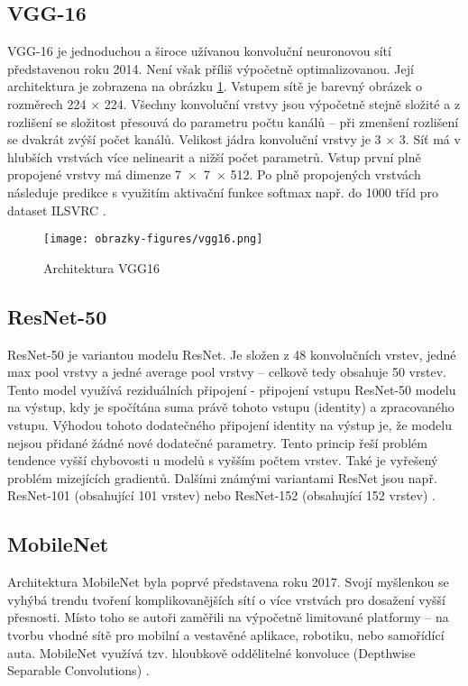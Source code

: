 \subsection{VGG-16}
VGG-16 je jednoduchou a široce užívanou konvoluční neuronovou sítí představenou roku 2014. Není však příliš výpočetně optimalizovanou. Její architektura je zobrazena na obrázku \ref{fig:vgg}. Vstupem sítě je barevný obrázek o rozměrech 224 $\times$ 224. Všechny konvoluční vrstvy jsou výpočetně stejně složité a z rozlišení se složitost přesouvá do parametru počtu kanálů -- při zmenšení rozlišení se dvakrát zvýší počet kanálů. Velikost jádra konvoluční vrstvy je 3 $\times$ 3. Síť má v hlubších vrstvách více nelinearit a nižší počet parametrů. Vstup první plně propojené vrstvy má dimenze 7~$\times$~7~$\times$ 512. Po plně propojených vrstvách následuje predikce s využitím aktivační funkce softmax např. do 1000 tříd pro dataset ILSVRC \cite{VGG16}.

\begin{figure}[!htbp]
    \centering
    \texttt{[image: obrazky-figures/vgg16.png]}
    \caption{Architektura VGG16 \cite{VGG16}}
    \label{fig:vgg}
\end{figure}

\subsection{ResNet-50}
ResNet-50 je variantou modelu ResNet. Je složen z 48 konvolučních vrstev, jedné max pool vrstvy a jedné average pool vrstvy -- celkově tedy obsahuje 50 vrstev. Tento model využívá reziduálních připojení - připojení vstupu ResNet-50 modelu na výstup, kdy je spočítána suma právě tohoto vstupu (identity) a zpracovaného vstupu. Výhodou tohoto dodatečného připojení identity na výstup je, že modelu nejsou přidané žádné nové dodatečné parametry. Tento princip řeší problém tendence vyšší chybovosti u modelů s vyšším počtem vrstev. Také je vyřešený problém mizejících gradientů. Dalšími známými variantami ResNet jsou např. ResNet-101 (obsahující 101 vrstev) nebo ResNet-152 (obsahující 152 vrstev) \cite{ResNet50}.
\subsection{MobileNet}
Architektura MobileNet byla poprvé představena roku 2017. Svojí myšlenkou se vyhýbá trendu tvoření komplikovanějších sítí o více vrstvách pro dosažení vyšší přesnosti. Místo toho se autoři zaměřili na výpočetně limitované platformy -- na tvorbu vhodné sítě pro mobilní a vestavěné aplikace, robotiku, nebo samořídící auta. MobileNet využívá tzv. hloubkově oddělitelné konvoluce (Depthwise Separable Convolutions) \cite{MobileNet}.

